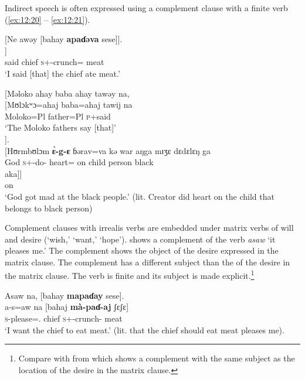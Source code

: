 Indirect speech is often expressed using a complement clause with a finite verb (\ref{ex:12:20} -- \ref{ex:12:21}).

\ea \label{ex:12:20}
{}[Ne awəy  [bahay  \textbf{apaɗəva}  sese]].\\
\gll  [nɛ  awij   [bahaj  \textbf{à-paɗə}\textbf{=va}  ʃɛʃɛ]]\\
      {\oneS}  said  chief  \textsc{s}+{\PFV}-crunch={\PRF}  meat\\
\glt  ‘I said [that] the chief ate meat.’
\z 

\ea \label{ex:12:21}
{}[Məloko  ahay  baba  ahay  tawəy  na,\\  
\gll  {}[Mʊlɔkʷɔ=ahaj   baba=ahaj  tawij         na \\     
      Moloko=Pl      father=Pl     \textsc{p}+said    {\PSP}  \\    
\glt ‘The Moloko fathers say [that]’\\
      
].\\
\gll {}[Hʊrmbʊlɔm \textbf{\`ɛ-g-ɛ}  ɓərav=va kə war aŋga mɪʒɛ dɛdɛlɛŋ ga\\ 
     \hspaceThis{[}God \textsc{s}+{\PFV}-do-{\CL} heart={\PRF} on child {\POSS} person black  {\ADJ}\\ 
     
     \medskip
\gll aka]]\\
     on\\
\glt  ‘God got mad at the black people.’ (lit. Creator did heart on the child that belongs to black person)
\z 

Complement clauses with irrealis verbs are embedded under matrix verbs of will and desire (‘wish,’ ‘want,’ ‘hope’).    shows a complement of the verb \textit{asaw } ‘it pleases me.’ The complement shows the object of the desire expressed in the matrix clause. The complement has a different subject than the {\LOC} of the desire in the matrix clause. The verb is finite and its subject is made explicit.\footnote{Compare with  from  which shows a complement with the same subject as the location of the desire in the matrix clause.}  

\ea \label{ex:12:22}
Asaw  na,  [bahay  \textbf{mapaɗay} sese].\\
\gll  a-s=aw   na   [bahaj   \textbf{mà-paɗ-aj}     ʃɛʃɛ]\\
      \textsc{s}-please={\oneS}.{\IO}  {\PSP}  chief  \textsc{s}+{\HOR}{}-crunch{}-{\CL}  meat\\
\glt  ‘I want the chief to eat meat.’ (lit. that the chief should eat meat pleases me). 
\z 

